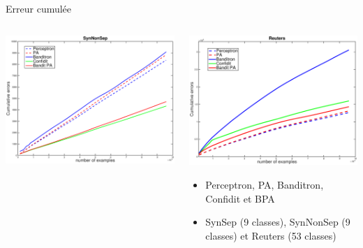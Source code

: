 \documentclass{beamer}
\begin{document}
\begin{frame}{Erreur cumulée}
\begin{columns}[t]
\begin{column}{.5\linewidth}
	\centerline{
		\includegraphics[width=\linewidth]{figs/SynNonSep.eps}
	}
				\end{column}
				\begin{column}{.5\linewidth}
		\centerline{
			\includegraphics[width=\linewidth]{figs/RCV1_v2_53class.eps}}
		\begin{footnotesize}
		\begin{itemize}
			\item Perceptron, PA, Banditron, Confidit et BPA
			\item SynSep (9 classes), SynNonSep (9 classes) et Reuters (53 classes)
		\end{itemize}
		\end{footnotesize}

		\end{column}	
			\end{columns}
\end{frame}
\end{document}
